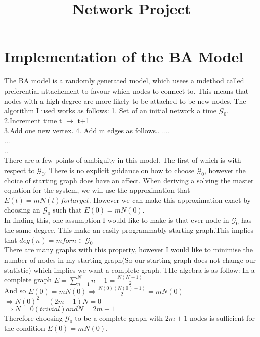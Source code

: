 \documentclass[]{article}
\title{Network Project}
\author{}
\begin{document}
\maketitle

\begin{abstract}

\end{abstract}

\section{Implementation of the BA Model}
The BA model is a randomly generated model, which usees a mdethod called preferential attachement to favour which nodes to connect to. This means that nodes with a high degree are more likely to be attached to be new nodes. The algorithm I used works as follows:
1. Set of an initial network a time $\mathcal{G_0}$.\\
\newline
2.Increment time t $\rightarrow$ t+1\\
\newline
3.Add one new vertex.
4. Add m edges as follows..
....\\...\\..\\
There are a few points of ambiguity in this model. The first of which is with respect to $\mathcal{G}_0$. There is no explicit guidance on how to choose $\mathcal{G}_0\!$, however the choice of starting graph does have an affect. When deriving a solving the master equation for the system, we will use the approximation that $E(t)=mN(t) \!for\! large\! t$. However we can make this approximation exact by choosing an $\mathcal{G}_0$ such that $E(0)=mN(0)$.\\
In finding this, one assumption I would like to make is that ever node in $\mathcal{G_0}$ has the same degree. This make an easily programmably starting graph.This implies that $deg(n)=m\! for\! n \in \mathcal{G_0}$\\
There are many graphs with this property, however I would like to minimise the number of nodes in my starting graph(So our starting graph does not change our statistic) which implies we want a complete graph. THe algebra is as follow:
In a complete graph $E=\sum_{n=1}^{N} n-1 = \frac{N(N-1)}{2}$\\
\vspace{0.2cm}
And so $E(0)=mN(0) \Rightarrow \frac{N(0)(N(0)-1)}{2}=mN(0)$\\
\vspace{0.2cm}
$\Rightarrow N(0)^2 - (2m -1)N = 0$\\
\vspace{0.2cm}
$\Rightarrow N=0 (trivial) and N=2m+1$\\
\vspace{0.2cm}
Therefore choosing $\mathcal{G}_0$ to be a complete graph with $2m+1$ nodes is sufficient for the condition $E(0)=mN(0)$.
\end{document}
